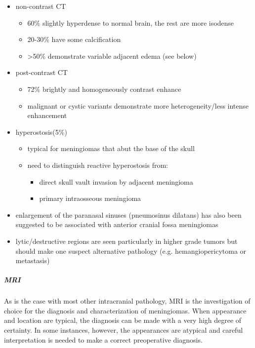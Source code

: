 \begin{itemize}
	\item
	non-contrast CT
	
	\begin{itemize}
		\item
		60\% slightly hyperdense to normal brain, the rest are more isodense
		\item
		20-30\% have some calcification 
		\item
		\textgreater50\% demonstrate variable adjacent edema (see below) 
	\end{itemize}
	\item
	post-contrast CT
	
	\begin{itemize}
		\item
		72\% brightly and homogeneously contrast enhance 
		\item
		malignant or cystic variants demonstrate more heterogeneity/less intense enhancement
	\end{itemize}
	\item
	hyperostosis(5\%) 
	
	\begin{itemize}
		\item
		typical for meningiomas that abut the base of the skull
		\item
		need to distinguish reactive hyperostosis from:
		
		\begin{itemize}
			\item
			direct skull vault invasion by adjacent meningioma
			\item
			primary intraosseous meningioma
		\end{itemize}
	\end{itemize}
	\item
	enlargement of the paranasal sinuses (pneumosinus dilatans) has also been suggested to be associated with anterior cranial fossa meningiomas 
	\item
	lytic/destructive regions are seen particularly in higher grade tumors but should make one suspect alternative pathology (e.g. hemangiopericytoma or metastasis)
\end{itemize}


\subparagraph{MRI}

As is the case with most other intracranial pathology, MRI is the investigation of choice for the diagnosis and characterization of meningiomas. When appearance and location are typical, the diagnosis can be made with a very high degree of certainty. In some instances, however, the appearances are atypical and careful interpretation is needed to make a correct preoperative diagnosis.

